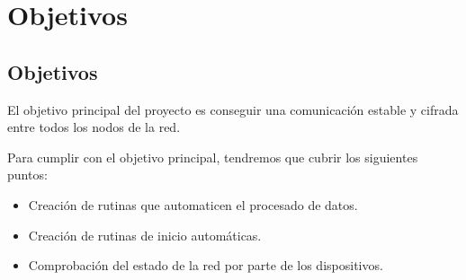 \chapter{Objetivos}
\section{Objetivos}

El objetivo principal del proyecto es conseguir una comunicación estable y cifrada entre todos los nodos de la red.

Para cumplir con el objetivo principal, tendremos que cubrir los siguientes puntos:
\begin{itemize}
	\item Creación de rutinas que automaticen el procesado de datos.
	\item Creación de rutinas de inicio automáticas.
	\item Comprobación del estado de la red por parte de los dispositivos.
\end{itemize}
